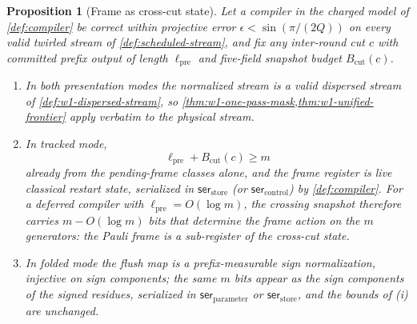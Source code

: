 \documentclass[aps,prx,reprint,floatfix,superscriptaddress]{revtex4-2}
\newtheorem{proposition}{Proposition}
\begin{document}
\begin{proposition}[Frame as cross-cut state]
\label{prop:frame-cross-cut}
Let a compiler in the charged model of \cref{def:compiler} be correct
within projective error $\epsilon<\sin(\pi/(2Q))$ on every valid twirled
stream of \cref{def:scheduled-stream}, and fix any inter-round cut $c$
with committed prefix output of length $\ell_{\mathrm{pre}}$ and
five-field snapshot budget $B_{\mathrm{cut}}(c)$.
\begin{enumerate}[leftmargin=1.9em,label=(\roman*)]
\item In both presentation modes the normalized stream is a valid
dispersed stream of \cref{def:w1-dispersed-stream}, so
\cref{thm:w1-one-pass-mask,thm:w1-unified-frontier} apply verbatim to
the physical stream.
\item In tracked mode,
\begin{equation}\label{eq:frame-lower}
 \ell_{\mathrm{pre}}+B_{\mathrm{cut}}(c)\geq m
\end{equation}
already from the pending-frame classes alone, and the frame register is
live classical restart state, serialized in
$\mathsf{ser}_{\mathrm{store}}$ (or $\mathsf{ser}_{\mathrm{control}}$)
by \cref{def:compiler}.  For a deferred compiler with
$\ell_{\mathrm{pre}}=O(\log m)$, the crossing snapshot therefore
carries $m-O(\log m)$ bits that determine the frame action on the $m$
generators: the Pauli frame is a sub-register of the cross-cut state.
\item In folded mode the flush map is a prefix-measurable sign
normalization, injective on sign components; the same $m$ bits appear
as the sign components of the signed residues, serialized in
$\mathsf{ser}_{\mathrm{parameter}}$ or $\mathsf{ser}_{\mathrm{store}}$,
and the bounds of (i) are unchanged.
\end{enumerate}
\end{proposition}
\end{document}
